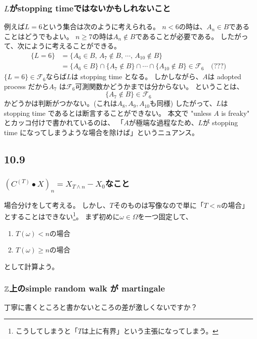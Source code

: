       \subsubsection{$L$がstopping timeではないかもしれないこと}
        例えば$L = 6$という集合は次のように考えられる。
        $n < 6$の時は、$A_n \in B$であることはどうでもよい。
        $n \ge 7 $の時は$A_n \notin B$であることが必要である。
        したがって、次にように考えることができる。
        \begin{align*}
          \{L = 6\} &= \{A_6 \in B, \, A_7 \notin B, \, \cdots ,\, A_{10} \notin B\}\\
          &= \{A_6 \in B\} \cap \{A_7 \notin B\} \cap \cdots \cap \{A_{10} \notin B\} \in \mathcal{F}_6 \quad \text{(???)}
        \end{align*}
        $\{L = 6 \} \in \mathcal{F}_6$ならば$L$は stopping time となる。
        しかしながら、$A$は adopted process だから$A_7$
        は$\mathcal{F}_6$可測関数かどうかまでは分からない。
        ということは、
        \[
          \{A_7 \notin B\} \in \mathcal{F}_6
        \]
        かどうかは判断がつかない。(これは$A_8,A_9,A_{10}$も同様)
        したがって、$L$は stopping time であるとは断言することができない。
        本文で "unless $A$ is freaky" とカッコ付けで書かれているのは、
        「$A$が極端な過程なため、$L$が stopping time になってしまうような場合を除けば」というニュアンス。

    \subsection{10.9}
      \subsubsection{$(C^{(T)} \bullet X)_n = X_{T \wedge n} - X_0$なこと}
        場合分けをして考える。
        しかし、$T$そのものは写像なので単に「$T < n$の場合」とすることはできない\footnote{こうしてしまうと「$T$は上に有界」という主張になってしまう。}。
        まず初めに$\omega \in \Omega$を一つ固定して、
        \begin{enumerate}
          \item $T(\omega) < n$の場合
          \item $T(\omega) \ge n$の場合
        \end{enumerate}
        として計算よう。

      \subsubsection{${\mathbb{Z}}$上のsimple random walk が martingale}
        丁寧に書くところと書かないところの差が激しくないですか？

